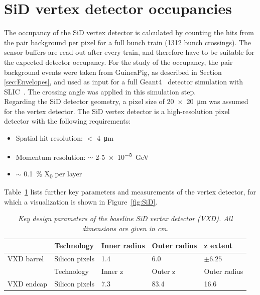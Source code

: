 
\section{SiD vertex detector occupancies}
The occupancy of the SiD vertex detector is calculated by counting the hits from the pair background per pixel for a full bunch train (1312 bunch crossings).
The sensor buffers are read out after every train, and therefore have to be suitable for the expected detector occupancy.
For the study of the occupancy, the pair background events were taken from GuineaPig, as described in Section \ref{sec:Envelopes}, and used as input for a full Geant4~\cite{geant_ref,geant_ref2} detector simulation with SLIC~\cite{SLIC}.
The crossing angle was applied in this simulation step.\\
Regarding the SiD detector geometry, a pixel size of \SI{20x20}{\micro\meter} was assumed for the vertex detector.
The SiD vertex detector is a high-resolution pixel detector with the following requirements:
\begin{itemize}
 \item Spatial hit resolution: $<$ \SI{4}{\micro\meter}
 \item Momentum resolution: $\sim$ 2-\SI{5e-5}{\GeV}
 \item $\sim$ \SI{0.1}{\percent} X\textsubscript{0} per layer
\end{itemize}
Table~\ref{tab:KeyParametersSiD} lists further key parameters and measurements of the vertex detector, for which a visualization is shown in Figure~\ref{fig:SiD}.
\begin{table}[h]
\centering
\begin{tabularx}{\textwidth}{l|llll}
\hline\hline
& Technology & Inner radius & Outer radius & z extent\\
\hline
VXD barrel & Silicon pixels & 1.4 & 6.0 & $\pm 6.25$ \\
\hline\hline
& Technology & Inner z & Outer z & Outer radius\\
\hline
VXD endcap & Silicon pixels & 7.3 & 83.4 & 16.6 \\
\hline\hline
\end{tabularx}
\caption{\textit{Key design parameters of the baseline SiD vertex detector (VXD). All dimensions are given in cm.}}
\label{tab:KeyParametersSiD}
\end{table}

